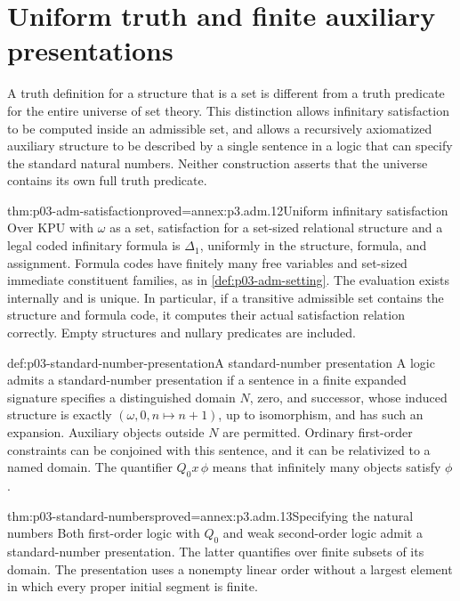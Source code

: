 \section{Uniform truth and finite auxiliary presentations}
\label{sec:p03-admissible-satisfaction}

A truth definition for a structure that is a set is different from a
truth predicate for the entire universe of set theory. This distinction
allows infinitary satisfaction to be computed inside an admissible set,
and allows a recursively axiomatized auxiliary structure to be described
by a single sentence in a logic that can specify the standard natural
numbers. Neither construction asserts that the universe contains its own
full truth predicate.

\begin{hbtheorem}{thm:p03-adm-satisfaction}{proved=annex:p3.adm.12}{Uniform infinitary satisfaction}
Over \(\mathrm{KPU}\) with \(\omega\) as a set, satisfaction for a
set-sized relational structure and a legal coded infinitary formula is
\(\Delta_1\), uniformly in the structure, formula, and assignment.
Formula codes have finitely many free variables and set-sized immediate
constituent families, as in \cref{def:p03-adm-setting}. The evaluation
exists internally and is unique. In particular, if a transitive
admissible set contains the structure and formula code, it computes
their actual satisfaction relation correctly. Empty structures and
nullary predicates are included.
\end{hbtheorem}

\begin{hbdefinition}{def:p03-standard-number-presentation}{A standard-number presentation}
A logic admits a standard-number presentation if a sentence in a finite
expanded signature specifies a distinguished domain \(N\), zero, and
successor, whose induced structure is exactly \((\omega,0,n\mapsto
n+1)\), up to isomorphism, and has such an expansion. Auxiliary objects
outside \(N\) are permitted. Ordinary first-order constraints can be
conjoined with this sentence, and it can be relativized to a named domain.
The quantifier \(Q_0x\,\phi\) means that infinitely many objects satisfy
\(\phi\).
\end{hbdefinition}

\begin{hblemma}{thm:p03-standard-numbers}{proved=annex:p3.adm.13}{Specifying the natural numbers}
Both first-order logic with \(Q_0\) and weak second-order logic admit a
standard-number presentation. The latter quantifies over finite subsets
of its domain. The presentation uses a nonempty linear order without a
largest element in which every proper initial segment is finite.
\end{hblemma}

